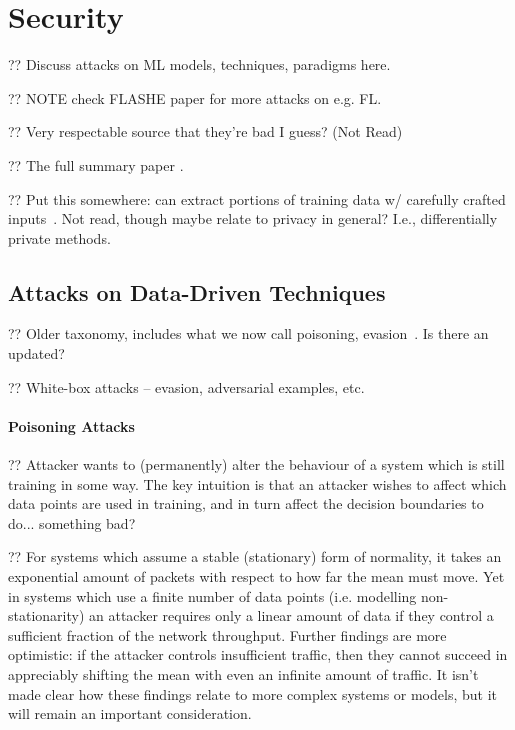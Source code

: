 \section{Security}\label{sec:ddn-security}

?? Discuss attacks on ML models, techniques, paradigms here.

?? NOTE check FLASHE paper for more attacks on e.g. FL.

?? Very respectable source \cite{DBLP:conf/eurosp/PapernotMJFCS16} that they're bad I guess? (Not Read)

?? The full summary paper \cite{DBLP:conf/eurosp/PapernotMSW18}.

?? Put this somewhere: can extract portions of training data w/ carefully crafted inputs~\parencite{DBLP:journals/corr/abs-2012-07805}. Not read, though maybe relate to privacy in general? I.e., differentially private methods.

\subsection{Attacks on Data-Driven Techniques}\label{sec:attacks-on-data-driven-techniques}

?? Older taxonomy, includes what we now call poisoning, evasion~\cite{DBLP:conf/ccs/BarrenoNSJT06}. Is there an updated?

?? White-box attacks -- evasion, adversarial examples, etc.

\paragraph{Poisoning Attacks}
?? Attacker wants to (permanently) alter the behaviour of a system which is still training in some way.
The key intuition is that an attacker wishes to affect which data points are used in training, and in turn affect the decision boundaries to do... something bad?

?? For systems which assume a stable (stationary) form of normality, it takes an exponential amount of packets with respect to how far the mean must move.
Yet in systems which use a finite number of data points (i.e. modelling non-stationarity) an attacker requires only a linear amount of data if they control a sufficient fraction of the network throughput.
Further findings are more optimistic: if the attacker controls insufficient traffic, then they cannot succeed in appreciably shifting the mean with even an infinite amount of traffic.
It isn't made clear how these findings relate to more complex systems or models, but it will remain an important consideration. \cite{DBLP:journals/jmlr/KloftL10}

